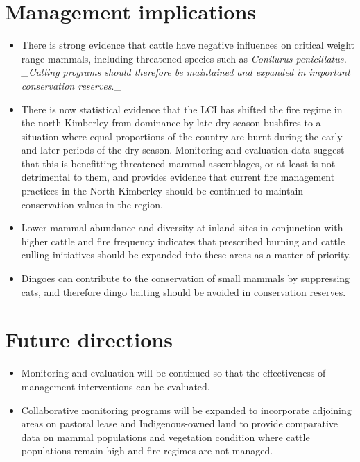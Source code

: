 \documentclass[version=last, paper=a4, DIV=18, usenames, dvipsnames]{scrartcl}
\begin{document}
\section{Management implications}



\begin{itemize}

  \item There is strong evidence that cattle have negative influences on critical weight range mammals, including threatened species such as \emph{Conilurus penicillatus. _Culling programs should therefore be maintained and expanded in important conservation reserves}._

  \item There is now statistical evidence that the LCI has shifted the fire regime in the north Kimberley from dominance by late dry season bushfires to a situation where equal proportions of the country are burnt during the early and later periods of the dry season. Monitoring and evaluation data suggest that this is benefitting threatened mammal assemblages, or at least is not detrimental to them, and provides evidence that current fire management practices in the North Kimberley should be continued to maintain conservation values in the region.

  \item Lower mammal abundance and diversity at inland sites in conjunction with higher cattle and fire frequency indicates that prescribed burning and cattle culling initiatives should be expanded into these areas as a matter of priority.

  \item Dingoes can contribute to the conservation of small mammals by suppressing cats, and therefore dingo baiting should be avoided in conservation reserves.

\end{itemize}






\section{Future directions}



\begin{itemize}

  \item Monitoring and evaluation will be continued so that the effectiveness of management interventions can be evaluated.

  \item Collaborative monitoring programs will be expanded to incorporate adjoining areas on pastoral lease and Indigenous-owned land to provide comparative data on mammal populations and vegetation condition where cattle populations remain high and fire regimes are not managed.

\end{itemize}






\clearpage
\end{document}
